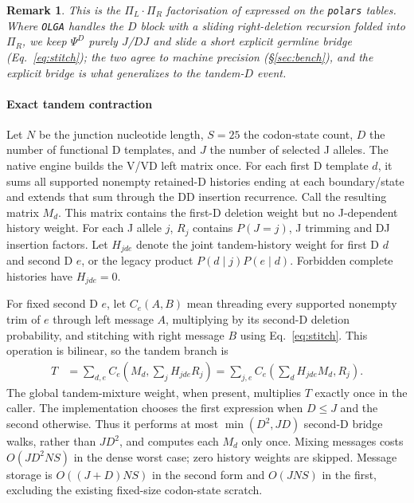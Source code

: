 \documentclass[11pt]{article}
\theoremstyle{oldplain}
\theoremstyle{oldrem}
\newtheorem{remark}{Remark}
\begin{document}
\begin{remark}
This is the $\Pi_L\!\cdot\!\Pi_R$ factorisation of \cite{Sethna2019} expressed on the
\texttt{polars} tables. Where \texttt{OLGA} handles the $D$ block with a sliding right-deletion recursion
folded into $\Pi_R$, we keep $\Psi^D$ purely $J$/$DJ$ and slide a short explicit germline bridge
(Eq.~\eqref{eq:stitch}); the two agree to machine precision (\S\ref{sec:bench}), and the explicit bridge
is what generalizes to the tandem-$D$ event.
\end{remark}

\paragraph{Exact tandem contraction}
Let $N$ be the junction nucleotide length, $S=25$ the codon-state count,
$D$ the number of functional D templates, and $J$ the number of selected J
alleles. The native engine builds the V/VD left matrix once.
For each first D template $d$, it sums all supported nonempty retained-D
histories ending at each boundary/state and extends that sum through the DD
insertion recurrence. Call the resulting matrix $M_d$.
This matrix contains the first-D deletion weight but no J-dependent history
weight. For each J allele $j$, $R_j$ contains $P(J=j)$, J trimming and DJ
insertion factors. Let $H_{jde}$ denote the joint tandem-history weight for
first D $d$ and second D $e$, or the legacy product
$P(d\mid j)P(e\mid d)$. Forbidden complete histories have $H_{jde}=0$.

For fixed second D $e$, let $C_e(A,B)$ mean threading every supported nonempty
trim of $e$ through left message $A$, multiplying by its second-D deletion
probability, and stitching with right message $B$ using
Eq.~\eqref{eq:stitch}. This operation is bilinear, so the tandem branch is
\begin{align}
 T &= \sum_{d,e} C_e\!\left(M_d,\sum_j H_{jde}R_j\right)
    = \sum_{j,e} C_e\!\left(\sum_d H_{jde}M_d,R_j\right).
\end{align}
The global tandem-mixture weight, when present, multiplies $T$ exactly once
in the caller. The implementation chooses the first expression when $D\le J$
and the second otherwise. Thus it performs at most
$\min(D^2,JD)$ second-D bridge walks, rather than $JD^2$, and computes each
$M_d$ only once. Mixing messages costs $O(JD^2NS)$ in the dense worst case;
zero history weights are skipped. Message storage is $O((J+D)NS)$ in the
second form and $O(JNS)$ in the first, excluding the existing fixed-size
codon-state scratch.
\end{document}

